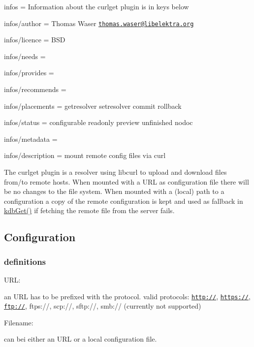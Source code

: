 
\begin{DoxyItemize}
\item infos = Information about the curlget plugin is in keys below
\item infos/author = Thomas Waser \href{mailto:thomas.waser@libelektra.org}{\tt thomas.\+waser@libelektra.\+org}
\item infos/licence = B\+SD
\item infos/needs =
\item infos/provides =
\item infos/recommends =
\item infos/placements = getresolver setresolver commit rollback
\item infos/status = configurable readonly preview unfinished nodoc
\item infos/metadata =
\item infos/description = mount remote config files via curl
\end{DoxyItemize}

The {\ttfamily curlget} plugin is a resolver using libcurl to upload and download files from/to remote hosts. When mounted with a {\ttfamily U\+RL} as configuration file there will be no changes to the file system. When mounted with a (local) path to a configuration a copy of the remote configuration is kept and used as fallback in {\ttfamily \hyperlink{group__kdb_ga28e385fd9cb7ccfe0b2f1ed2f62453a1}{kdb\+Get()}} if fetching the remote file from the server fails.

\subsection*{Configuration}

\subsubsection*{definitions}

{\ttfamily U\+RL}\+:

an U\+RL has to be prefixed with the protocol. valid protocols\+: {\ttfamily \href{http://}{\tt http\+://}}, {\ttfamily \href{https://}{\tt https\+://}}, {\ttfamily \href{ftp://}{\tt ftp\+://}}, {\ttfamily ftps\+://}, {\ttfamily scp\+://}, {\ttfamily sftp\+://}, {\ttfamily smb\+://} (currently not supported)

{\ttfamily Filename}\+:

can bei either an {\ttfamily U\+RL} or a local configuration file.

